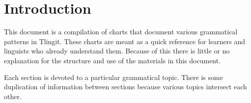 
\clearpage
\section{Introduction}\label{sec:intro}

\begin{multicols}{2}
\noindent
This document is a compilation of charts that document various grammatical patterns in Tlingit.
These charts are meant as a quick reference for learners and linguists who already understand them.
Because of this there is little or no explanation for the structure and use of the materials in this document.
 
Each section is devoted to a particular grammatical topic.
There is some duplication of information between sections because various topics intersect each other.
\end{multicols}
